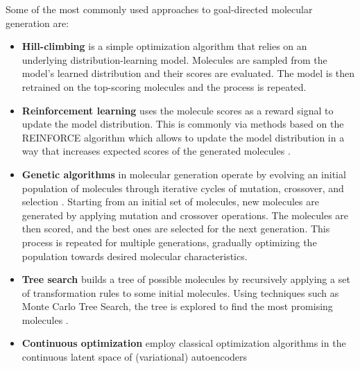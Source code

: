 Some of the most commonly used approaches to goal-directed molecular generation are:
\begin{itemize}
      \item \textbf{Hill-climbing}
            \citep{seglerGeneratingFocusedMolecule2018,xieMARSMarkovMolecular2021,thomasAugmentedHillClimbIncreases2022}
            is a simple optimization algorithm that relies on an underlying distribution-learning model.
            Molecules are sampled from the model's learned distribution and their scores are evaluated.
            The model is then retrained on the top-scoring molecules and the process is repeated.
      \item \textbf{Reinforcement learning} uses the molecule scores as a reward signal to update
            the model distribution. This is commonly via methods based on the REINFORCE algorithm
            \citep{williamsSimpleStatisticalGradientfollowing1992} which allows to update the model
            distribution in a way that increases expected scores of the generated molecules
            \citep{olivecronaMolecularDenovoDesign2017,thomasAugmentedHillClimbIncreases2022,youGraphConvolutionalPolicy2019,guoAugmentedMemoryCapitalizing2023}.
      \item \textbf{Genetic algorithms} in molecular generation operate by evolving an initial
            population of molecules through iterative cycles of mutation, crossover, and selection \citep{jensenGraphbasedGeneticAlgorithm2019,nigamGenerativeModelsSuperfast2021,yoshikawaPopulationbasedNovoMolecule2018}.
            Starting from an initial set of molecules, new molecules are generated by applying
            mutation and crossover operations. The molecules are then scored, and the best ones are
            selected for the next generation. This process is repeated for multiple generations,
            gradually optimizing the population towards desired molecular characteristics.
      \item \textbf{Tree search} builds a tree of possible molecules by recursively applying a set of transformation rules
            to some initial molecules. Using techniques such as Monte Carlo Tree Search, the tree is
            explored to find the most promising molecules \citep{yangChemTSEfficientPython2017,jensenGraphbasedGeneticAlgorithm2019}.
      \item \textbf{Continuous optimization} employ classical optimization algorithms in the continuous
            latent space of (variational) autoencoders
            \citep{gomez-bombarelliAutomaticChemicalDesign2018,kusnerGrammarVariationalAutoencoder2017,winterEfficientMultiobjectiveMolecular2019}

\end{itemize}
